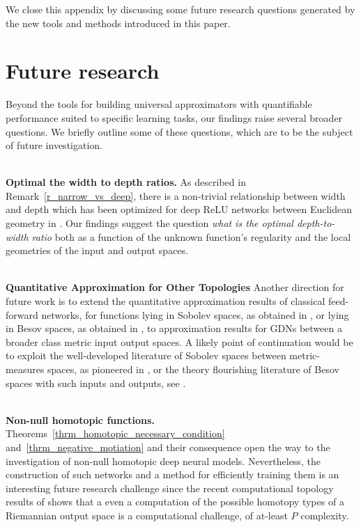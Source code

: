 \documentclass[anon,12pt]{colt2021} %
\begin{document}
We close this appendix by discussing some future research questions generated by the new tools and methods introduced in this paper.  
\section*{Future research}
Beyond the tools for building universal approximators with quantifiable performance suited to specific learning tasks, our findings raise several broader questions. We briefly outline some of these questions, which are to be the subject of future investigation.  

\hfill\\
\noindent \textbf{Optimal the width to depth ratios.} 
As described in Remark~\ref{r_narrow_vs_deep}, there is a non-trivial relationship between width and depth which has been optimized for deep ReLU networks between Euclidean geometry in \cite{pmlrv75yarotsky18a}.  Our findings suggest the question \textit{what is the optimal depth-to-width ratio} both as a function of the unknown function's regularity and the local geometries of the input and output spaces. 

\hfill\\
\noindent \textbf{Quantitative Approximation for Other Topologies}
Another direction for future work is to extend the quantitative approximation results of classical feed-forward networks, for functions lying in Sobolev spaces, as obtained in \cite{Yarotski,QuantitativeDeepReLUSobolev,YAROTSKYSobolev,SIEGEL2020313}, or lying in Besov spaces, as obtained in \cite{Besov,gribonval2019approximation}, to approximation results for GDNs between a broader class metric input output spaces.  A likely point of continuation would be to exploit the well-developed literature of Sobolev spaces between metric-measures spaces, as pioneered in \cite{KorevaarSchoen1993,PiotsPekkaClassic1995Pointcareinequalityweak,HajlaszsobolMMs1996}, or the theory flourishing literature of Besov spaces with such inputs and outputs, see \cite{BesovMMs2008}.  

\hfill\\
\noindent \textbf{Non-null homotopic functions.} Theorems~\ref{thrm_homotopic_necessary_condition} and~\ref{thrm_negative_motiation} and their consequence open the way to the investigation of non-null homotopic deep neural models. Nevertheless, the construction of such networks and a method for efficiently training them is an interesting future research challenge since the recent computational topology results of \cite{MR3268623,matousek2013computing} shows that a even a computation of the possible homotopy types of a Riemannian output space is a computational challenge, of at-least $P$ complexity.  
\end{document}
